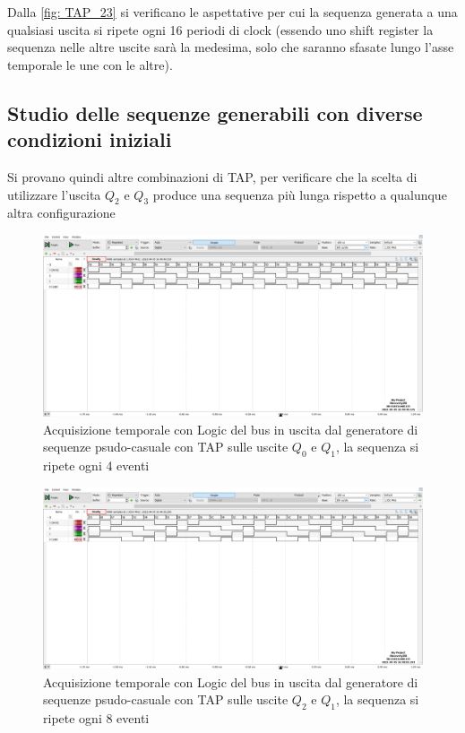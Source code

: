 \documentclass[10pt, a4paper, italian]{article}
\begin{document}
Dalla \cref{fig: TAP_23} si verificano le aspettative per cui la sequenza generata a una qualsiasi uscita si ripete ogni 16 periodi di clock (essendo uno shift register la sequenza nelle altre uscite sarà la medesima, solo che saranno sfasate lungo l'asse temporale le une con le altre).
\subsection{Studio delle sequenze generabili con diverse condizioni iniziali}
Si provano quindi altre combinazioni di TAP, per verificare che la scelta di utilizzare l'uscita $Q_2$ e $Q_3$ produce una sequenza più lunga rispetto a qualunque altra configurazione
\begin{figure}[htbp]
\centering
	\includegraphics[width=\textwidth]{4.b_10}
	\caption{Acquisizione temporale con Logic del bus in uscita dal generatore di sequenze psudo-casuale con TAP sulle uscite $Q_0$ e $Q_1$, la sequenza si ripete ogni 4 eventi
	\label{fig: TAP_10}}
\end{figure}
\begin{figure}[htbp]
	\includegraphics[width=\textwidth]{4.b_21}
	\caption{Acquisizione temporale con Logic del bus in uscita dal generatore di sequenze psudo-casuale con TAP sulle uscite $Q_2$ e $Q_1$, la sequenza si ripete ogni 8 eventi
	\label{fig: TAP_21}}
\end{figure}
\end{document}
